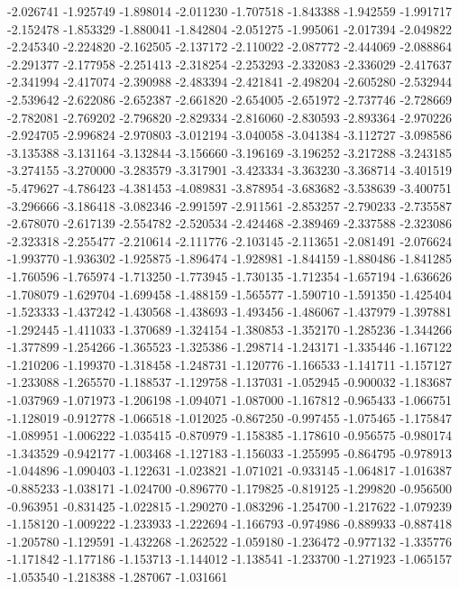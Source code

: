 -2.026741
-1.925749
-1.898014
-2.011230
-1.707518
-1.843388
-1.942559
-1.991717
-2.152478
-1.853329
-1.880041
-1.842804
-2.051275
-1.995061
-2.017394
-2.049822
-2.245340
-2.224820
-2.162505
-2.137172
-2.110022
-2.087772
-2.444069
-2.088864
-2.291377
-2.177958
-2.251413
-2.318254
-2.253293
-2.332083
-2.336029
-2.417637
-2.341994
-2.417074
-2.390988
-2.483394
-2.421841
-2.498204
-2.605280
-2.532944
-2.539642
-2.622086
-2.652387
-2.661820
-2.654005
-2.651972
-2.737746
-2.728669
-2.782081
-2.769202
-2.796820
-2.829334
-2.816060
-2.830593
-2.893364
-2.970226
-2.924705
-2.996824
-2.970803
-3.012194
-3.040058
-3.041384
-3.112727
-3.098586
-3.135388
-3.131164
-3.132844
-3.156660
-3.196169
-3.196252
-3.217288
-3.243185
-3.274155
-3.270000
-3.283579
-3.317901
-3.423334
-3.363230
-3.368714
-3.401519
-5.479627
-4.786423
-4.381453
-4.089831
-3.878954
-3.683682
-3.538639
-3.400751
-3.296666
-3.186418
-3.082346
-2.991597
-2.911561
-2.853257
-2.790233
-2.735587
-2.678070
-2.617139
-2.554782
-2.520534
-2.424468
-2.389469
-2.337588
-2.323086
-2.323318
-2.255477
-2.210614
-2.111776
-2.103145
-2.113651
-2.081491
-2.076624
-1.993770
-1.936302
-1.925875
-1.896474
-1.928981
-1.844159
-1.880486
-1.841285
-1.760596
-1.765974
-1.713250
-1.773945
-1.730135
-1.712354
-1.657194
-1.636626
-1.708079
-1.629704
-1.699458
-1.488159
-1.565577
-1.590710
-1.591350
-1.425404
-1.523333
-1.437242
-1.430568
-1.438693
-1.493456
-1.486067
-1.437979
-1.397881
-1.292445
-1.411033
-1.370689
-1.324154
-1.380853
-1.352170
-1.285236
-1.344266
-1.377899
-1.254266
-1.365523
-1.325386
-1.298714
-1.243171
-1.335446
-1.167122
-1.210206
-1.199370
-1.318458
-1.248731
-1.120776
-1.166533
-1.141711
-1.157127
-1.233088
-1.265570
-1.188537
-1.129758
-1.137031
-1.052945
-0.900032
-1.183687
-1.037969
-1.071973
-1.206198
-1.094071
-1.087000
-1.167812
-0.965433
-1.066751
-1.128019
-0.912778
-1.066518
-1.012025
-0.867250
-0.997455
-1.075465
-1.175847
-1.089951
-1.006222
-1.035415
-0.870979
-1.158385
-1.178610
-0.956575
-0.980174
-1.343529
-0.942177
-1.003468
-1.127183
-1.156033
-1.255995
-0.864795
-0.978913
-1.044896
-1.090403
-1.122631
-1.023821
-1.071021
-0.933145
-1.064817
-1.016387
-0.885233
-1.038171
-1.024700
-0.896770
-1.179825
-0.819125
-1.299820
-0.956500
-0.963951
-0.831425
-1.022815
-1.290270
-1.083296
-1.254700
-1.217622
-1.079239
-1.158120
-1.009222
-1.233933
-1.222694
-1.166793
-0.974986
-0.889933
-0.887418
-1.205780
-1.129591
-1.432268
-1.262522
-1.059180
-1.236472
-0.977132
-1.335776
-1.171842
-1.177186
-1.153713
-1.144012
-1.138541
-1.233700
-1.271923
-1.065157
-1.053540
-1.218388
-1.287067
-1.031661
